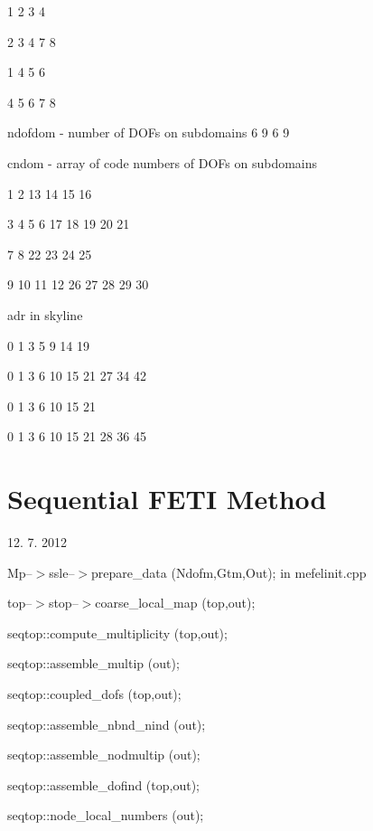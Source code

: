 1 2 3 4

2 3 4 7 8

1 4 5 6

4 5 6 7 8

ndofdom - number of DOFs on subdomains 
6 9 6 9

cndom - array of code numbers of DOFs on subdomains 

 1 2 13 14 15 16

 3 4 5 6 17 18 19 20 21

 7 8 22 23 24 25

 9 10 11 12 26 27 28 29 30


adr in skyline

 0 1 3 5 9 14 19

 0 1 3 6 10 15 21 27 34 42

 0 1 3 6 10 15 21

 0 1 3 6 10 15 21 28 36 45


\section{Sequential FETI Method}
12. 7. 2012

Mp--$>$ssle--$>$prepare\_data (Ndofm,Gtm,Out); in mefelinit.cpp

\hspace{10mm} top--$>$stop--$>$coarse\_local\_map (top,out);

\hspace{20mm}  seqtop::compute\_multiplicity (top,out);

\hspace{30mm}  seqtop::assemble\_multip (out);

\hspace{30mm}  seqtop::coupled\_dofs (top,out);

\hspace{30mm}  seqtop::assemble\_nbnd\_nind (out);

\hspace{30mm}  seqtop::assemble\_nodmultip (out);

\hspace{30mm}  seqtop::assemble\_dofind (top,out);

\hspace{20mm}  seqtop::node\_local\_numbers (out);

